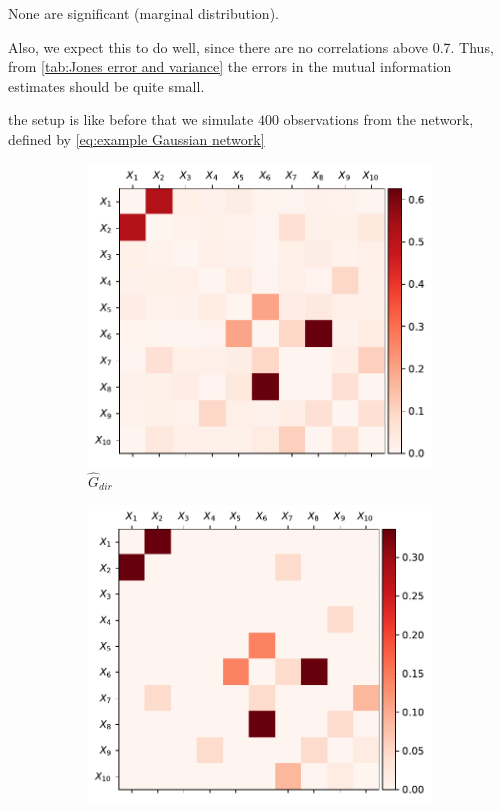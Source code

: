 \documentclass[../Thesis.tex]{subfiles}
\begin{document}
None are significant (marginal distribution).

Also, we expect this to do well, since there are no correlations above 0.7. Thus, from \autoref{tab:Jones error and variance} the errors in the mutual information estimates should be quite small.

the setup is like before that we simulate $400$ observations from the network, defined by \autoref{eq:example Gaussian network}




\begin{figure}[H]
    \centering
    \begin{subfigure}[t]{0.49\linewidth}
        \includegraphics[width = \linewidth]{figures/ND examples/Gaussian network 10 - G_dir - symmetric.pdf}
        \caption{$\hat{G}_{dir}$}
    \end{subfigure}
    \hfill
    \begin{subfigure}[t]{0.49\linewidth}
        \includegraphics[width = \linewidth]{figures/ND examples/Gaussian network 10 - G_dir true - symmetric.pdf}

\end{subfigure}
\end{figure}
\end{document}
